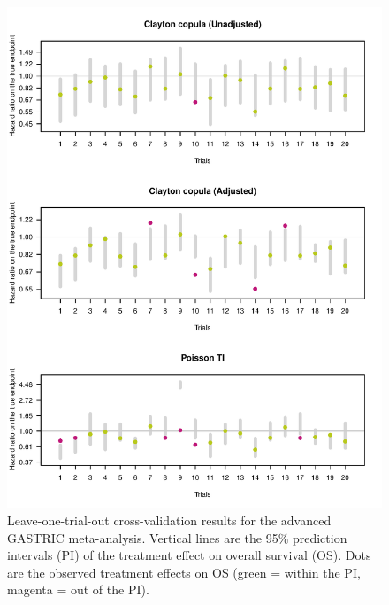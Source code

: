 \documentclass[]{scrartcl}\usepackage[]{graphicx}\usepackage[]{color}
\begin{document}
{{\begin{figure}
\includegraphics[width=\textwidth]{./loocv-1} \caption[Leave-one-trial-out cross-validation results for the advanced GASTRIC meta-analysis]{Leave-one-trial-out cross-validation results for the advanced GASTRIC meta-analysis. Vertical lines are the 95\% prediction intervals (PI) of the treatment effect on overall survival (OS). Dots are the observed treatment effects on OS (green = within the PI, magenta = out of the PI).}\label{fig:loocv}
\end{figure}




}}
\end{document}
